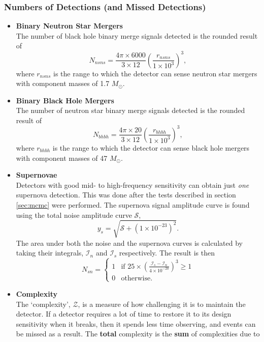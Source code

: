 \documentclass{article}
\begin{document}
\subsubsection{Numbers of Detections (and Missed Detections)}
\begin{itemize}
\item\textbf{Binary Neutron Star Mergers}\\
    The number of black hole binary merge signals detected is the rounded result of
    \[
    N_{nsns} = \frac{4\pi\times6000}{3 \times 12}\left(\frac{r_{nsns}}{1 \times 10^3}\right)^3 ,
    \]
    where $r_{nsns}$ is the range to which the detector can sense
    neutron star mergers with component masses of 1.7 $M_{\odot}$.
\item\textbf{Binary Black Hole Mergers}\\
    The number of neutron star binary merge signals detected is the rounded result of
    \[
    N_{bhbh} = \frac{4\pi\times20}{3 \times 12}\left(\frac{r_{bhbh}}{1 \times 10^3}\right)^3 ,
    \]
    where $r_{bhbh}$ is the range to which the detector can sense
    black hole mergers with component masses of 47 $M_{\odot}$.
\item\textbf{Supernovae}\\
    Detectors with good mid- to high-frequency sensitivity can obtain
    just \textit{one} supernova detection. This was done after the
    tests described in section \ref{sec:mcmc} were performed. The
    supernova signal amplitude curve is found using the total noise
    amplitude curve $\mathcal{S}$,
    \[
    y_s = \sqrt{\mathcal{S} + (1 \times 10^{-23})^2}.
    \]
    The area under both the noise and the supernova curves is
    calculated by taking their integrals, $\mathcal{I}_n$ and
    $\mathcal{I}_s$ respectively. The result is then
    \[
    N_{sn} = \begin{cases}
             1 & \text{if $25 \times \left(\frac{\mathcal{I}_s - \mathcal{I}_n}{4 \times 10^{-20}}\right)^3 \geq 1$} \\
             0 & \text{otherwise}.
             \end{cases}
    \]
\item\textbf{Complexity}\\
The `complexity', $\mathcal{Z}$, is a measure of how challenging it is
to maintain the detector. If a detector requires a lot of time to
restore it to its design sensitivity when it breaks, then it spends
less time observing, and events can be missed as a result. The
\textbf{total} complexity is the \textbf{sum} of complexities due to

\end{itemize}
\end{document}
